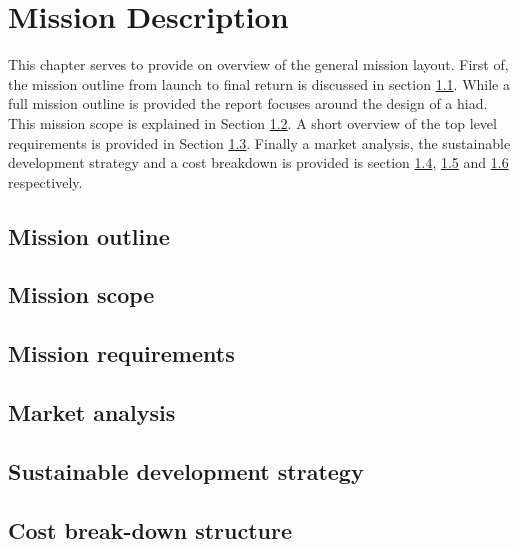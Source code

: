 \section{Mission Description}\label{cha:missiondescr}

This chapter serves to provide on overview of the general mission layout. First of, the mission outline from launch to final return is discussed in section \ref{sec:missionoutline}. While a full mission outline is provided the report focuses around the design of a \gls{hiad}. This mission scope is explained in Section \ref{sec:missionscope}. A short overview of the top level requirements is provided in Section \ref{sec:missionreq}. Finally a market analysis, the sustainable development strategy and a cost breakdown is provided is section \ref{sec:marketanalysis}, \ref{sec:sustainable} and \ref{sec:costbreakdown} respectively. 

\subsection{Mission outline} \label{sec:missionoutline}


\subsection{Mission scope} \label{sec:missionscope}


\subsection{Mission requirements} \label{sec:missionreq}


\subsection{Market analysis} \label{sec:marketanalysis}


\subsection{Sustainable development strategy} \label{sec:sustainable}


\subsection{Cost break-down structure} \label{sec:costbreakdown}


%

